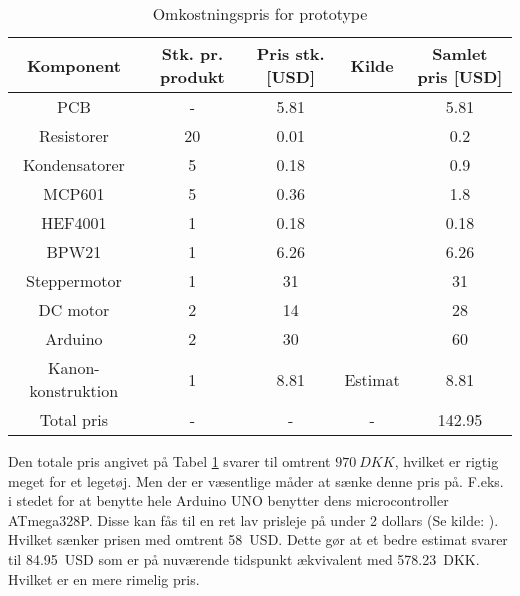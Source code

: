 \begin{table}[H] \label{tab:omkostning}
	\caption{Omkostningspris for prototype} %
	\centering
		\begin{tabular}{c|c c c c} 
		
		Komponent & Stk. pr. produkt & Pris stk. [USD] & Kilde & Samlet pris [USD]\\ [0.5ex] 
		\hline 
			PCB & - & 5.81 & \cite{price:PCB} & 5.81\\ 
			Resistorer & 20 & 0.01& \cite{price:resistor} & 0.2\\
			Kondensatorer & 5 &  0.18 & \cite{price:capacitor} & 0.9\\
			MCP601 & 5 & 0.36& \cite{price:MCP601} & 1.8\\
			HEF4001 & 1 &0.18& \cite{price:HEF4001} & 0.18\\
			BPW21 & 1 &6.26& \cite{price:BPW21} & 6.26 \\
			Steppermotor &1 & 31 & \cite{price:stepper}&31 \\
			DC motor & 2 & 14 & \cite{price:dcmotor} &28 \\ 
			Arduino & 2 & 30 &\cite{price:arduino} & 60 \\
			Kanon-konstruktion & 1 & 8.81 & Estimat & 8.81 \\
			Total pris & - &- & - & 142.95\\[1ex]
		\hline %
	\end{tabular}
\end{table}
Den totale pris angivet på Tabel \ref{tab:omkostning} svarer til omtrent $\SI{970}{DKK}$, hvilket er rigtig meget for et legetøj. Men der er væsentlige måder at sænke denne pris på. F.eks. i stedet for at benytte hele Arduino UNO benytter dens microcontroller ATmega328P. Disse kan fås til en ret lav prisleje på under 2 dollars (Se kilde: \cite{price:atmega}). Hvilket sænker prisen med omtrent \SI{58}{USD}. Dette gør at et bedre estimat svarer til \SI{84.95}{USD} som er på nuværende tidspunkt ækvivalent med \SI{578.23}{DKK}. Hvilket er en mere rimelig pris.



